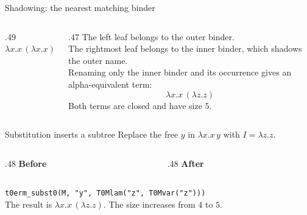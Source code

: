 \documentclass[aspectratio=169,11pt]{beamer}
\begin{document}
\begin{frame}{Shadowing: the nearest matching binder}
\begin{columns}[c]
\begin{column}{.49\textwidth}\centering
$\lambda x.x\,(\lambda x.x)$\\[1em]
\end{column}
\begin{column}{.47\textwidth}
The left leaf belongs to the outer binder.\\[1em]
The rightmost leaf belongs to the inner binder, which shadows the outer name.\\[1em]
Renaming only the inner binder and its occurrence gives an alpha-equivalent term:
\[
\lambda x.x\,(\lambda z.z)
\]
Both terms are closed and have size $5$.
\end{column}
\end{columns}
\end{frame}

\begin{frame}{Substitution inserts a subtree}
Replace the free $y$ in $\lambda x.x\,y$ with $I=\lambda z.z$.
\begin{columns}[T]
\begin{column}{.48\textwidth}\centering
\textbf{Before}\\[.7em]
\end{column}
\begin{column}{.48\textwidth}\centering
\textbf{After}\\[.7em]
\end{column}
\end{columns}
\vfill
\texttt{t0erm\_subst0(M, "y", T0Mlam("z", T0Mvar("z")))}\\[.5em]
The result is $\lambda x.x\,(\lambda z.z)$. The size increases from $4$ to $5$.
\end{frame}
\end{document}
